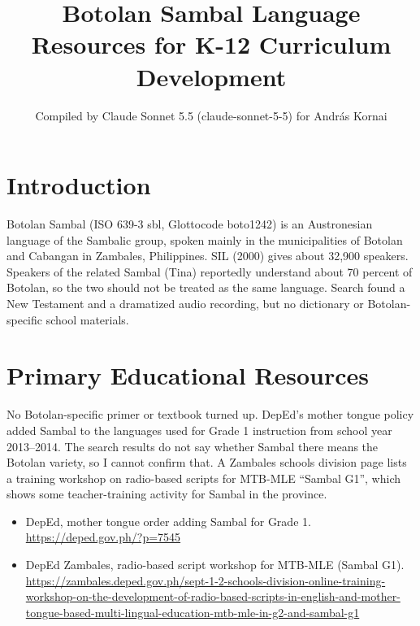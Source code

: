 \documentclass[12pt]{article}
\title{Botolan Sambal Language Resources for K-12 Curriculum Development}
\author{Compiled by Claude Sonnet 5.5 (claude-sonnet-5-5) for Andr\'as Kornai}
\date{}
\begin{document}
\maketitle

\section{Introduction}
Botolan Sambal (ISO 639-3 sbl, Glottocode boto1242) is an Austronesian language of the Sambalic group, spoken mainly in the municipalities of Botolan and Cabangan in Zambales, Philippines. SIL (2000) gives about 32,900 speakers. Speakers of the related Sambal (Tina) reportedly understand about 70 percent of Botolan, so the two should not be treated as the same language. Search found a New Testament and a dramatized audio recording, but no dictionary or Botolan-specific school materials.

\section{Primary Educational Resources}
No Botolan-specific primer or textbook turned up. DepEd's mother tongue policy added Sambal to the languages used for Grade 1 instruction from school year 2013--2014. The search results do not say whether Sambal there means the Botolan variety, so I cannot confirm that. A Zambales schools division page lists a training workshop on radio-based scripts for MTB-MLE ``Sambal G1'', which shows some teacher-training activity for Sambal in the province.
\begin{itemize}
\item DepEd, mother tongue order adding Sambal for Grade 1. \url{https://deped.gov.ph/?p=7545}
\item DepEd Zambales, radio-based script workshop for MTB-MLE (Sambal G1). \url{https://zambales.deped.gov.ph/sept-1-2-schools-division-online-training-workshop-on-the-development-of-radio-based-scripts-in-english-and-mother-tongue-based-multi-lingual-education-mtb-mle-in-g2-and-sambal-g1}
\end{itemize}
\end{document}
